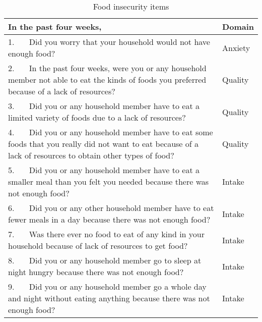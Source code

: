 \begin{table}[htbp]
\begin{tabular}{p{}p{}}
    \bottomrule
    \end{tabular}%
    \egroup
\end{table}%







\begin{table}[htbp]
	\scriptsize
	\caption{Food insecurity items}
	\label{tab:n2a_impact:foodsecitems}
	\bgroup
	\def\arraystretch{1.3}
    \begin{tabular}{p{}p{}}
    \toprule
	
    \textbf{In the past four weeks}, & \textbf{Domain}\\
    \midrule
	1.    Did you worry that your household would not have enough food? & Anxiety\\
	2.    In the past four weeks, were you or any household member not able to eat the kinds of foods you preferred because of a lack of resources? & Quality\\
	3.    Did you or any household member have to eat a limited variety of foods due to a lack of resources? & Quality\\
	4.    Did you or any household member have to eat some foods that you really did not want to eat because of a lack of resources to obtain other types of food? & Quality\\
	5.    Did you or any household member have to eat a smaller meal than you felt you needed because there was not enough food? & Intake\\
	6.    Did you or any other household member have to eat fewer meals in a day because there was not enough food? & Intake\\
	7.    Was there ever no food to eat of any kind in your household because of lack of resources to get food? & Intake\\
	8.    Did you or any household member go to sleep at night hungry because there was not enough food? & Intake\\
	9.    Did you or any household member go a whole day and night without eating anything because there was not enough food? & Intake\\


\end{tabular}
\end{table}
